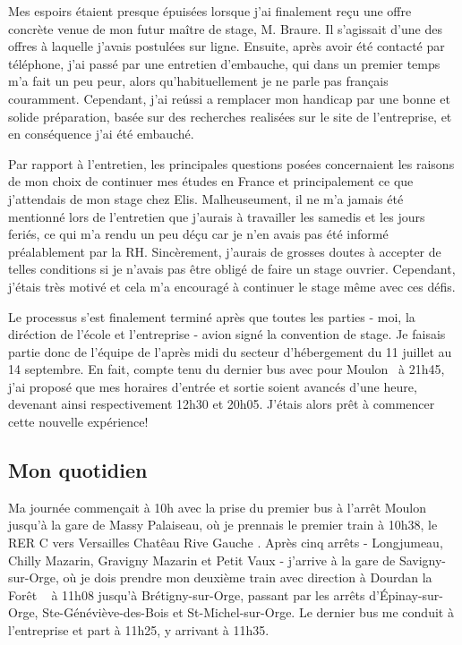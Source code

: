 \documentclass{article}
\begin{document}
\vspace{12pt}

Mes espoirs étaient presque épuisées lorsque j'ai finalement reçu une offre
concrète venue de mon futur maître de stage, M. Braure. Il s'agissait d'une des
offres à laquelle j'avais postulées sur ligne. Ensuite, après avoir été
contacté par téléphone, j'ai passé par une entretien d'embauche, qui
dans un premier temps m'a fait un peu peur, alors qu'habituellement je ne parle
pas français couramment. Cependant, j'ai reússi a remplacer mon handicap par une
bonne et solide préparation, basée sur des recherches realisées sur le site de
l'entreprise, et en conséquence j'ai été embauché.

\vspace{12pt}

Par rapport à l'entretien, les principales questions posées concernaient les
raisons de mon choix de continuer mes études en France et principalement ce
que j'attendais de mon stage chez Elis. Malheuseument, il ne m'a jamais été
mentionné lors de l'entretien que j'aurais à travailler les samedis et  les
jours feriés, ce qui m'a rendu un peu déçu car je n'en avais pas été informé
préalablement par la RH. Sincèrement, j'aurais de grosses doutes à accepter de 
telles conditions si je n'avais pas être obligé de faire un stage ouvrier.
Cependant, j'étais très motivé et cela m'a encouragé à continuer le stage
même avec ces défis.

\vspace{12pt}

Le processus s'est finalement terminé après que toutes les parties - moi, la
diréction de l'école et l'entreprise - avion  signé la convention de stage. Je
faisais partie donc de l'équipe de l'après midi du secteur d'hébergement du 11
juillet au 14 septembre. En fait, compte tenu du dernier bus avec pour 
\og Moulon\fg~ à 21h45, j'ai proposé que mes horaires d'entrée et sortie soient
avancés d'une heure, devenant ainsi respectivement 12h30 et 20h05.  J'étais
alors prêt à commencer cette nouvelle expérience!

\subsection{Mon quotidien}

Ma journée commençait à 10h avec la prise du premier bus à l'arrêt \og
Moulon \fg~ jusqu'à la gare de Massy Palaiseau, où je prennais le premier
train à 10h38, le RER C vers \og Versailles Chatêau Rive Gauche \fg. Après cinq
arrêts - Longjumeau, Chilly Mazarin, Gravigny Mazarin et Petit Vaux - j'arrive à
la gare de Savigny-sur-Orge, où je dois prendre mon deuxième train avec
direction à \og Dourdan la Forêt \fg~ à 11h08 jusqu'à Brétigny-sur-Orge,
passant par les arrêts d'Épinay-sur-Orge, Ste-Généviève-des-Bois et
St-Michel-sur-Orge. Le dernier bus me conduit à l'entreprise et part à 11h25, y
arrivant à 11h35.
\end{document}
